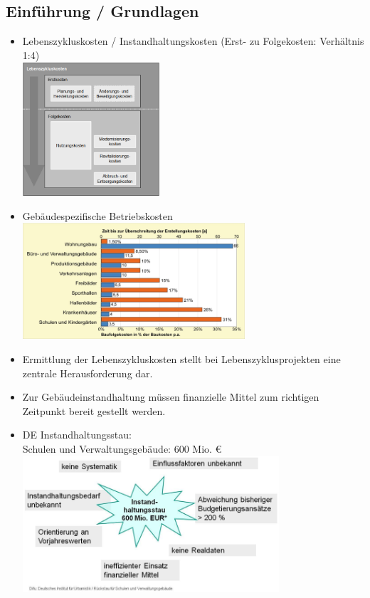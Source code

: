 \documentclass[fleqn,twoside,dvipsnames]{article}
\begin{document}
    \subsection{Einführung / Grundlagen}
        \begin{itemize}
            \item Lebenszykluskosten / Instandhaltungskosten (Erst- zu Folgekosten: Verhältnis 1:4)\\
                    \includegraphics[width=0.4\textwidth]{Grafiken/Budgetierung/Lebenszykluskosten - Instandhaltungskosten.png}
            \item Gebäudespezifische Betriebskosten\\
                    \includegraphics[width=0.65\textwidth]{Grafiken/Budgetierung/Gebaeudespezifische Betriebskosten.png}
            \item Ermittlung der Lebenszykluskosten stellt bei Lebenszyklusprojekten eine zentrale Herausforderung dar.
            \item Zur Gebäudeinstandhaltung müssen finanzielle Mittel zum richtigen Zeitpunkt bereit gestellt werden.
            \item DE Instandhaltungsstau: \\Schulen und Verwaltungsgebäude: 600 Mio. € \label{ISHR}\\
                    \includegraphics[width=0.75\textwidth]{Grafiken/Budgetierung/IHRS.png}

\end{itemize}
\end{document}
